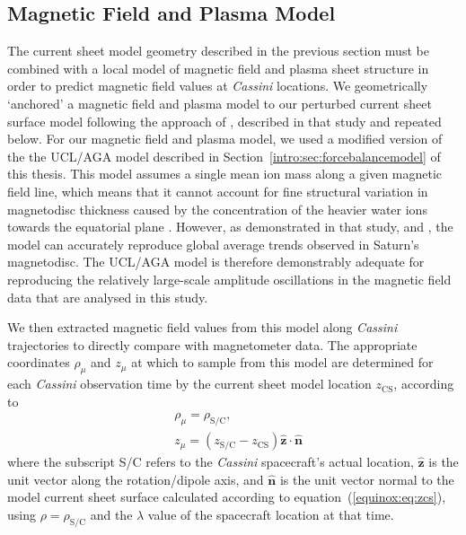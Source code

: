 \subsection{Magnetic Field and Plasma Model}\label{equinox:sec:plasmamodel}
The current sheet model geometry described in the previous section must be combined with a local model of magnetic field and plasma sheet structure in order to predict magnetic field values at \textit{Cassini} locations. We geometrically `anchored' a magnetic field and plasma model to our perturbed current sheet surface model following the approach of \citet{achilleos2014}, described in that study and repeated below. For our magnetic field and plasma model, we used a modified version of the the UCL/AGA model described in Section~\ref{intro:sec:forcebalancemodel} of this thesis. This model assumes a single mean ion mass along a given magnetic field line, which means that it cannot account for fine structural variation in magnetodisc thickness caused by the concentration of the heavier water ions towards the equatorial plane \citep[e.g.][]{persoon2009, nemeth2011}. However, as demonstrated in that study, \citet{achilleos2010b} and \citet{sergis2018}, the model can accurately reproduce global average trends observed in Saturn's magnetodisc. The UCL/AGA model is therefore demonstrably adequate for reproducing the relatively large-scale amplitude oscillations in the magnetic field data that are analysed in this study.

We then extracted magnetic field values from this model along \textit{Cassini} trajectories to directly compare with magnetometer data. The appropriate coordinates $\rho_\mu$ and $z_\mu$ at which to sample from this model are determined for each \textit{Cassini} observation time by the current sheet model location $z_\mathrm{CS}$, according to
\begin{align}\label{equinox:eq:coordinatetransform}
& \rho_\mu = \rho_\mathrm{S/C},\nonumber\\
& z_\mu = (z_\mathrm{S/C} - z_\mathrm{CS})\hat{\boldsymbol{z}}\cdot\hat{\boldsymbol{n}}
\end{align}
where the subscript S/C refers to the \textit{Cassini} spacecraft's actual location, $\hat{\boldsymbol{z}}$ is the unit vector along the rotation/dipole axis, and $\hat{\boldsymbol{n}}$ is the unit vector normal to the model current sheet surface calculated according to equation~(\ref{equinox:eq:zcs}), using $\rho = \rho_\mathrm{S/C}$ and the $\lambda$ value of the spacecraft location at that time.

